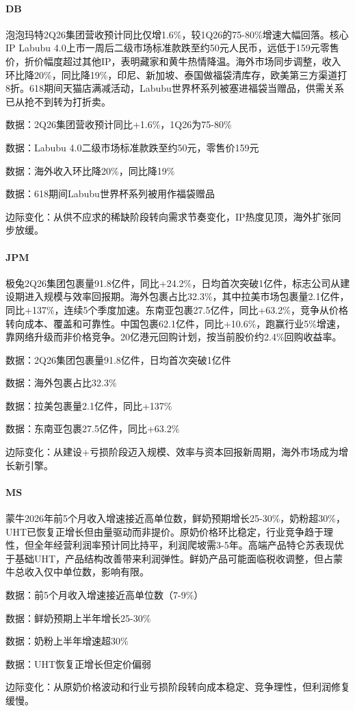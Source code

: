 \documentclass[11pt]{ctexart}
\begin{document}
\paragraph{DB} 泡泡玛特2Q26集团营收预计同比仅增1.6\%，较1Q26的75-80\%增速大幅回落。核心IP Labubu 4.0上市一周后二级市场标准款跌至约50元人民币，远低于159元零售价，折价幅度超过其他IP，表明藏家和黄牛热情降温。海外市场同步调整，收入环比降20\%，同比降19\%，印尼、新加坡、泰国做福袋清库存，欧美第三方渠道打8折。618期间天猫店满减活动，Labubu世界杯系列被塞进福袋当赠品，供需关系已从抢不到转为打折卖。
{\small\color{refgray}数据：2Q26集团营收预计同比+1.6\%，1Q26为75-80\%\par}
{\small\color{refgray}数据：Labubu 4.0二级市场标准款跌至约50元，零售价159元\par}
{\small\color{refgray}数据：海外收入环比降20\%，同比降19\%\par}
{\small\color{refgray}数据：618期间Labubu世界杯系列被用作福袋赠品\par}
{\small\color{refgray}边际变化：从供不应求的稀缺阶段转向需求节奏变化，IP热度见顶，海外扩张同步放缓。\par}
\paragraph{JPM} 极兔2Q26集团包裹量91.8亿件，同比+24.2\%，日均首次突破1亿件，标志公司从建设期进入规模与效率回报期。海外包裹占比32.3\%，其中拉美市场包裹量2.1亿件，同比+137\%，连续5个季度加速。东南亚包裹27.5亿件，同比+63.2\%，竞争从价格转向成本、覆盖和可靠性。中国包裹62.1亿件，同比+10.6\%，跑赢行业5\%增速，靠网络升级而非价格竞争。20亿港元回购计划，按当前股价约2.4\%回购收益率。
{\small\color{refgray}数据：2Q26集团包裹量91.8亿件，日均首次突破1亿件\par}
{\small\color{refgray}数据：海外包裹占比32.3\%\par}
{\small\color{refgray}数据：拉美包裹量2.1亿件，同比+137\%\par}
{\small\color{refgray}数据：东南亚包裹27.5亿件，同比+63.2\%\par}
{\small\color{refgray}边际变化：从建设+亏损阶段迈入规模、效率与资本回报新周期，海外市场成为增长新引擎。\par}
\paragraph{MS} 蒙牛2026年前5个月收入增速接近高单位数，鲜奶预期增长25-30\%，奶粉超30\%，UHT已恢复正增长但由量驱动而非提价。原奶价格环比稳定，行业竞争趋于理性，但全年经营利润率预计同比持平，利润爬坡需3-5年。高端产品特仑苏表现优于基础UHT，产品结构改善带来利润弹性。鲜奶产品可能面临税收调整，但占蒙牛总收入仅中单位数，影响有限。
{\small\color{refgray}数据：前5个月收入增速接近高单位数（7-9\%）\par}
{\small\color{refgray}数据：鲜奶预期上半年增长25-30\%\par}
{\small\color{refgray}数据：奶粉上半年增速超30\%\par}
{\small\color{refgray}数据：UHT恢复正增长但定价偏弱\par}
{\small\color{refgray}边际变化：从原奶价格波动和行业亏损阶段转向成本稳定、竞争理性，但利润修复缓慢。\par}
\end{document}
